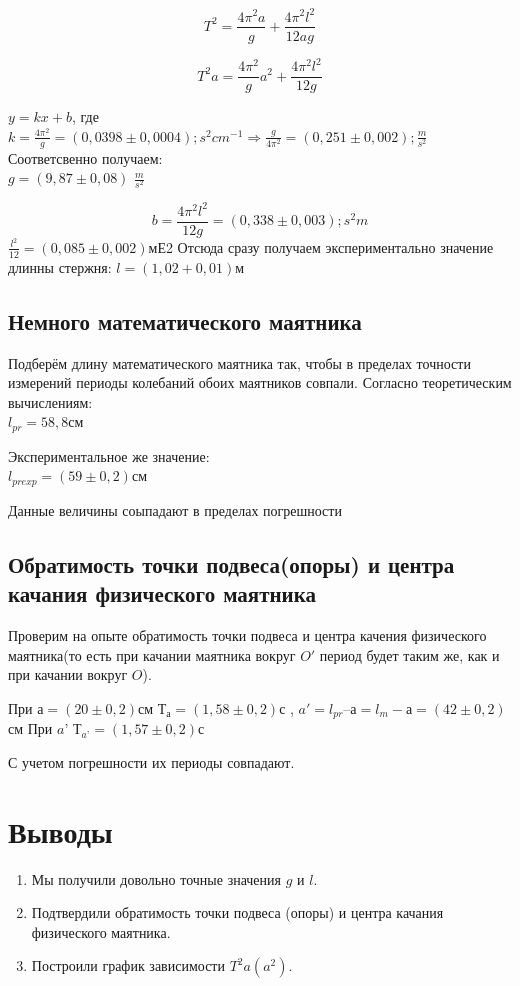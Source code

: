 \documentclass[13pt,a4paper]{article}
\begin{document}
\begin{displaymath}
T^2=\frac{4\pi^2a}{g}+\frac{4\pi^2l^2}{12ag}
\end{displaymath}

\begin{displaymath}
T^2a=\frac{4\pi^2}{g}a^2+\frac{4\pi^2l^2}{12g}
\end{displaymath}


$y=kx+b$, где $k=\frac{4\pi^2}{g}=(0,0398\pm0,0004); s^2cm^{-1}\Rightarrow \frac{g}{4\pi^2}=(0,251\pm0,002);\frac{m}{s^2}$
Соответсвенно получаем:\\
$g=(9,87\pm0,08)$ $\frac{m}{s^2}$

\begin{displaymath}
b=\frac{4\pi^2l^2}{12g}=(0,338\pm0,003); s^2m
\end{displaymath}
$\frac{l^2}{12}=(0,085\pm0,002)$мЕ2
Отсюда сразу получаем экспериментально значение длинны стержня:
$l=(1,02+0,01)$м


\subsection{Немного математического маятника}

Подберём длину математического маятника так, чтобы в пределах точности измерений периоды колебаний обоих маятников совпали.
Согласно теоретическим вычислениям:\\
$l_{pr}=58,8$см

Экспериментальное же значение:\\
$l_{pr exp}=(59\pm0,2)$см

Данные величины соыпадают в пределах погрешности 


\subsection{Обратимость точки подвеса(опоры) и центра качания физического маятника}

Проверим на опыте обратимость точки подвеса и центра качения физического маятника(то есть при качании маятника вокруг $O'$ период будет таким же, как и при качании вокруг $O$).

При $а=(20\pm0,2)$см   $Т_{а}=(1,58\pm0,2)$с  ,  $a'= l_{pr} – а= l_{m}-а=(42\pm0,2)$см 
При $a’$   $Т_{a’}=(1,57\pm0,2)$с

С учетом погрешности их периоды совпадают.

\section{Выводы}
\begin{enumerate}
\item Мы получили довольно точные значения $g$ и $l$.
\item Подтвердили обратимость точки подвеса (опоры) и центра качания физического маятника.
\item Построили график зависимости $T^2a(a^2)$.
\end{enumerate}
\end{document}
